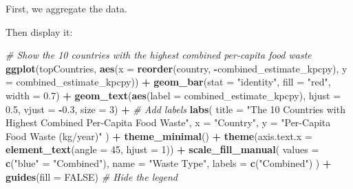 \documentclass[
]{article}
\newenvironment{Shaded}{\begin{snugshade}}{\end{snugshade}}
\newcommand{\AttributeTok}[1]{\textcolor[rgb]{0.13,0.29,0.53}{#1}}
\newcommand{\CommentTok}[1]{\textcolor[rgb]{0.56,0.35,0.01}{\textit{#1}}}
\newcommand{\ConstantTok}[1]{\textcolor[rgb]{0.56,0.35,0.01}{#1}}
\newcommand{\DecValTok}[1]{\textcolor[rgb]{0.00,0.00,0.81}{#1}}
\newcommand{\FloatTok}[1]{\textcolor[rgb]{0.00,0.00,0.81}{#1}}
\newcommand{\FunctionTok}[1]{\textcolor[rgb]{0.13,0.29,0.53}{\textbf{#1}}}
\newcommand{\NormalTok}[1]{#1}
\newcommand{\OtherTok}[1]{\textcolor[rgb]{0.56,0.35,0.01}{#1}}
\newcommand{\SpecialCharTok}[1]{\textcolor[rgb]{0.81,0.36,0.00}{\textbf{#1}}}
\newcommand{\StringTok}[1]{\textcolor[rgb]{0.31,0.60,0.02}{#1}}
\begin{document}
First, we aggregate the data.

\begin{Shaded}
\end{Shaded}

Then display it:

\begin{Shaded}
\begin{Highlighting}[]
\CommentTok{\# Show the 10 countries with the highest combined per{-}capita food waste}
\FunctionTok{ggplot}\NormalTok{(topCountries, }\FunctionTok{aes}\NormalTok{(}\AttributeTok{x =} \FunctionTok{reorder}\NormalTok{(country, }\SpecialCharTok{{-}}\NormalTok{combined\_estimate\_kpcpy), }\AttributeTok{y =}\NormalTok{ combined\_estimate\_kpcpy)) }\SpecialCharTok{+}
  \FunctionTok{geom\_bar}\NormalTok{(}\AttributeTok{stat =} \StringTok{"identity"}\NormalTok{, }\AttributeTok{fill =} \StringTok{"red"}\NormalTok{, }\AttributeTok{width =} \FloatTok{0.7}\NormalTok{) }\SpecialCharTok{+}
  \FunctionTok{geom\_text}\NormalTok{(}\FunctionTok{aes}\NormalTok{(}\AttributeTok{label =}\NormalTok{ combined\_estimate\_kpcpy), }\AttributeTok{hjust =} \FloatTok{0.5}\NormalTok{, }\AttributeTok{vjust =} \SpecialCharTok{{-}}\FloatTok{0.3}\NormalTok{, }\AttributeTok{size =} \DecValTok{3}\NormalTok{) }\SpecialCharTok{+}  \CommentTok{\# Add labels}
  \FunctionTok{labs}\NormalTok{(}
    \AttributeTok{title =} \StringTok{"The 10 Countries with Highest Combined Per{-}Capita Food Waste"}\NormalTok{,}
    \AttributeTok{x =} \StringTok{"Country"}\NormalTok{,}
    \AttributeTok{y =} \StringTok{"Per{-}Capita Food Waste (kg/year)"}
\NormalTok{  ) }\SpecialCharTok{+}
  \FunctionTok{theme\_minimal}\NormalTok{() }\SpecialCharTok{+}
  \FunctionTok{theme}\NormalTok{(}\AttributeTok{axis.text.x =} \FunctionTok{element\_text}\NormalTok{(}\AttributeTok{angle =} \DecValTok{45}\NormalTok{, }\AttributeTok{hjust =} \DecValTok{1}\NormalTok{)) }\SpecialCharTok{+}
  \FunctionTok{scale\_fill\_manual}\NormalTok{(}
    \AttributeTok{values =} \FunctionTok{c}\NormalTok{(}\StringTok{"blue"} \OtherTok{=} \StringTok{"Combined"}\NormalTok{),}
    \AttributeTok{name =} \StringTok{"Waste Type"}\NormalTok{,}
    \AttributeTok{labels =} \FunctionTok{c}\NormalTok{(}\StringTok{"Combined"}\NormalTok{)}
\NormalTok{  ) }\SpecialCharTok{+}
  \FunctionTok{guides}\NormalTok{(}\AttributeTok{fill =} \ConstantTok{FALSE}\NormalTok{)  }\CommentTok{\# Hide the legend}
\end{Highlighting}
\end{Shaded}
\end{document}

